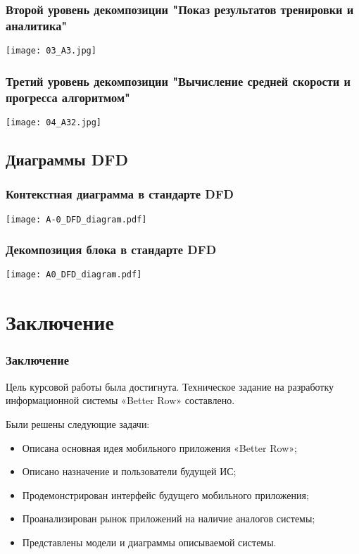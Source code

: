 \documentclass[10pt,utf8,presentation,notheorems,xcolor=dvipsnames,compress]{beamer}
\begin{document}
\begin{frame}
\frametitle{Второй уровень декомпозиции "Показ результатов тренировки и аналитика"}
\begin{center}
\texttt{[image: 03\_A3.jpg]}%
\end{center}
\end{frame}

\begin{frame}
\frametitle{Третий уровень декомпозиции "Вычисление средней скорости и прогресса алгоритмом"}
\begin{center}
\texttt{[image: 04\_A32.jpg]}%
\end{center}
\end{frame}

\subsection{Диаграммы DFD}

\begin{frame}
\frametitle{Контекстная диаграмма в стандарте DFD}
\begin{center}
\texttt{[image: A-0\_DFD\_diagram.pdf]}%
\end{center}
\end{frame}

\begin{frame}
\frametitle{Декомпозиция блока в стандарте DFD}
\begin{center}
\texttt{[image: A0\_DFD\_diagram.pdf]}%
\end{center}
\end{frame}

\section{Заключение}
\begin{frame}
\frametitle{Заключение}

\begin{block}{Цель курсовой работы была достигнута.}
Техническое задание на разработку информационной системы «Better
Row» составлено.
\end{block}

\begin{block}{Были решены следующие задачи:}
\begin{itemize}
 \item Описана основная идея мобильного приложения «Better Row»;
 \item Описано назначение и пользователи будущей ИС;
 \item Продемонстрирован интерфейс будущего мобильного приложения;
 \item Проанализирован рынок приложений на наличие аналогов системы;
 \item Представлены модели и диаграммы описываемой системы.
\end{itemize}
\end{block}

\end{frame}
\end{document}
